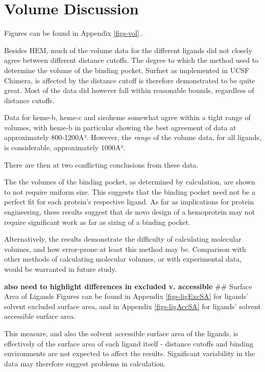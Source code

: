 \documentclass[a4paper, nobind]{templates/ociamthesis}
\begin{document}
\hypertarget{volume-discussion}{%
\section{Volume Discussion}\label{volume-discussion}}

Figures can be found in Appendix \ref{figs-vol}..

Besides HEM, much of the volume data for the different ligands did not closely agree between different distance cutoffs. The degree to which the method used to determine the volume of the binding pocket, Surfnet as implemented in UCSF Chimera, is affected by the distance cutoff is therefore demonstrated to be quite great. Most of the data did however fall within reasonable bounds, regardless of distance cutoffs.

Data for heme-b, heme-c and siroheme somewhat agree within a tight range of volumes, with heme-b in particular showing the best agreement of data at approximately 800-1200A³. However, the \emph{range} of the volume data, for all ligands, is considerable, approximately 1000A³.

There are then at two conflicting conclusions from these data.

The the volumes of the binding pocket, as determined by calculation, are shown to not require uniform size. This suggests that the binding pocket need not be a perfect fit for each protein's respective ligand. As far as implications for protein engineering, these results suggest that de novo design of a hemoprotein may not require significant work as far as sizing of a binding pocket.

Alternatively, the results demonstrate the difficulty of calculating molecular volumes, and how error-prone at least this method may be. Comparison with other methods of calculating molecular volumes, or with experimental data, would be warranted in future study.

\textbf{also need to highlight differences in excluded v. accessible}
\#\# Surface Area of Ligands
Figures can be found in Appendix \ref{figs-ligExcSA} for ligands' solvent excluded surface area, and
in Appendix \ref{figs-ligAccSA} for ligands' solvent accessible surface area.

This measure, and also the solvent accessible surface area of the ligands, is effectively of the surface area of each ligand itself - distance cutoffs and binding environments are not expected to affect the results. Significant variability in the data may therefore suggest problems in calculation.
\end{document}
